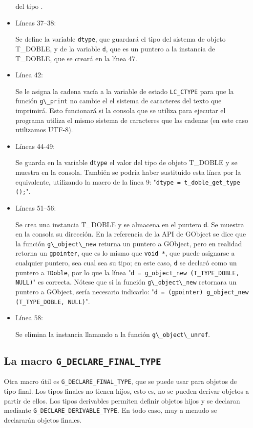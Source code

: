 \begin{itemize}
  del tipo .
\item Líneas 37--38:\par
  Se define la variable \texttt{dtype}, que guardará el tipo del sistema de objeto \textsf{T\_DOBLE}, y de la
  variable \texttt{d}, que es un puntero a la instancia de \textsf{T\_DOBLE}, que se creará en la línea 47.
\item Línea 42:\par
  Se le asigna la cadena vacía a la variable de estado \texttt{LC\_CTYPE} para que la función
  \passthrough{\lstinline!g\_print!} no cambie el el sistema de caracteres del texto que imprimirá.
  Esto funcionará si la consola que se utiliza para ejecutar el programa utiliza el mismo sistema de caracteres
  que las cadenas (en este caso utilizamos UTF-8).
\item Líneas 44-49:\par
  Se guarda en la variable \texttt{dtype} el valor del tipo de objeto \textsf{T\_DOBLE} y se muestra en la consola.
  También se podría haber sustituido esta línea por la equivalente, utilizando la macro de la línea 9:
  "\texttt{dtype = t\_doble\_get\_type ();}".
\item Líneas 51--56:\par
  Se crea una instancia \textsf{T\_DOBLE} y se almacena en el puntero \texttt{d}. Se muestra en la consola su
  dirección. En la referencia de la API de \textsf{GObject} se dice que la función
  \passthrough{\lstinline!g\_object\_new!} returna un puntero a \textsf{GObject}, pero en realidad retorna un
  \texttt{gpointer}, que es lo mismo que \texttt{void *}, que puede asignarse a cualquier puntero, sea cual sea
  su tipo; en este caso, \texttt{d} se declaró como un puntero a \texttt{TDoble}, por lo que la línea
  "\texttt{d = g\_object\_new (T\_TYPE\_DOBLE, NULL)}" es correcta. Nótese que si la función
  \passthrough{\lstinline!g\_object\_new!} retornara un puntero a \textsf{GObject}, sería necesario indicarlo:
  "\texttt{d = (gpointer) g\_object\_new (T\_TYPE\_DOBLE, NULL)}".
\item Línea 58:\par
  Se elimina la instancia llamando a la función \passthrough{\lstinline!g\_object\_unref!}.
\end{itemize}

\subsection{La macro \texttt{G\_DECLARE\_FINAL\_TYPE}}
Otra macro útil es \texttt{G\_DECLARE\_FINAL\_TYPE}, que se puede usar para objetos de tipo final.
Los tipos finales no tienen hijos, esto es, no se pueden derivar objetos a partir de ellos.
Los tipos derivables permiten definir objetos hijos y se declaran mediante \texttt{G\_DECLARE\_DERIVABLE\_TYPE}. En todo caso, muy a menudo se declararán  objetos finales.

